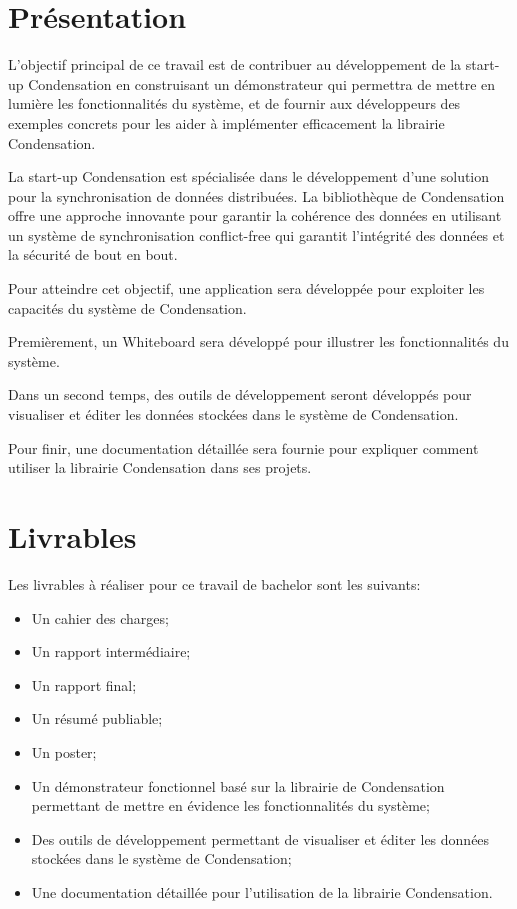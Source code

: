 \section*{Présentation}
L'objectif principal de ce travail est de contribuer au développement de la start-up Condensation en construisant un démonstrateur qui permettra de mettre en lumière les fonctionnalités du système, et de fournir aux développeurs des exemples concrets pour les aider à implémenter efficacement la librairie Condensation.

La start-up Condensation est spécialisée dans le développement d'une solution pour la synchronisation de données distribuées. La bibliothèque de Condensation offre une approche innovante pour garantir la cohérence des données en utilisant un système de synchronisation conflict-free qui garantit l'intégrité des données et la sécurité de bout en bout.

Pour atteindre cet objectif, une application sera développée pour exploiter les capacités du système de Condensation.

Premièrement, un Whiteboard sera développé pour illustrer les fonctionnalités du système.

Dans un second temps, des outils de développement seront développés pour visualiser et éditer les données stockées dans le système de Condensation.

Pour finir, une documentation détaillée sera fournie pour expliquer comment utiliser la librairie Condensation dans ses projets.
\newpage
\section*{Livrables}
Les livrables à réaliser pour ce travail de bachelor sont les suivants:

\begin{itemize}
    \item Un cahier des charges;
    \item Un rapport intermédiaire;
    \item Un rapport final;
    \item Un résumé publiable;
    \item Un poster;
    \item Un démonstrateur fonctionnel basé sur la librairie de Condensation permettant de mettre en évidence les fonctionnalités du système;
    \item Des outils de développement permettant de visualiser et éditer les données stockées dans le système de Condensation;
    \item Une documentation détaillée pour l'utilisation de la librairie Condensation.
\end{itemize}

